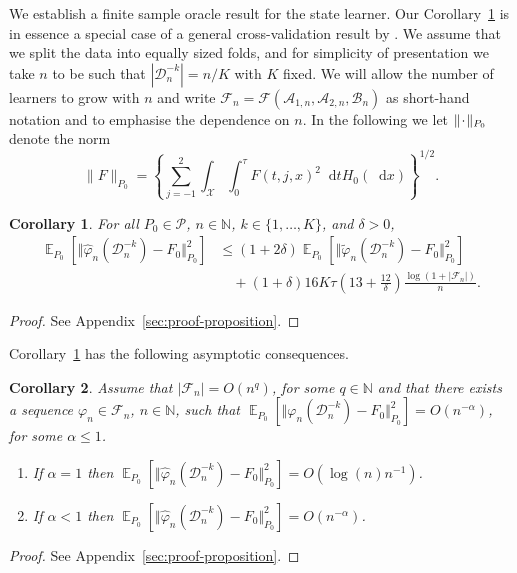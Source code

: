 \documentclass{statsoc}
\newtheorem{corollary}{Corollary}
\DeclareMathOperator{\E}{\mathbb{E}} %
\newcommand{\N}{\mathbb{N}}
\newcommand{\blank}{\makebox[1ex]{\textbf{$\cdot$}}}
\renewcommand{\phi}{\varphi}
\newcommand*\diff{\mathop{}\!\mathrm{d}}
\newcommand\bigO{\textit{O}}
\newcommand{\1}{\mathds{1}}
\newcommand{\data}{\ensuremath{\mathcal{D}}}
\begin{document}
We establish a finite sample oracle result for the state learner.
Our Corollary~\ref{cor:oracle-prop} is in essence a special case of a
general cross-validation result by \cite{vaart2006oracle}. We assume
that we split the data into equally sized folds, and for simplicity of
presentation we take \( n \) to be such that
\( |\data_n^{-k}| = n/K \) with \( K \) fixed. We will allow the
number of learners to grow with \( n \) and write
\( \mathcal{F}_n=\mathcal{F}(\mathcal{A}_{1,n}, \mathcal{A}_{2,n},
\mathcal{B}_n)\) as short-hand notation and to emphasise the
dependence on \( n \).
In the following we let \( \| \blank \|_{P_0} \) denote the norm
\begin{equation}
  \label{eq:norm}
  \| F \|_{P_0} = 
  \left\{
    \sum_{j=-1}^{2}\int_{\mathcal{X}} \int_0^{\tau} F(t, j, x)^2 \diff t H_0( \diff x)
  \right\}^{1/2}.
\end{equation}
\begin{corollary}
  \label{cor:oracle-prop}
  For all \(P_0\in\mathcal{P}\), \( n \in \N \), \( k \in \{1, \dots, K\} \),
  and $\delta>0$,
  \begin{align*}
    \E_{P_0}{\left[ \Vert \hat{\phi}_n(\data_n^{-k}) - F_0 \Vert_{P_0}^2 \right]}
    & \leq (1 + 2\delta)
      \E_{P_0}{\left[ \Vert \tilde{\phi}_n(\data_n^{-k}) - F_0 \Vert_{P_0}^2 \right]}
    \\
    & \quad
      + (1+ \delta) 16   K \tau
      \left(
      13 + \frac{12}{\delta}
      \right)
      \frac{\log(1 + |\mathcal{F}_n|)}{n}.
  \end{align*}
\end{corollary}
\begin{proof}
  See Appendix~\ref{sec:proof-proposition}.
\end{proof}

Corollary~\ref{cor:oracle-prop} has the following asymptotic consequences.

\begin{corollary}
  \label{cor:asymp-cons}
  Assume that \( |\mathcal{F}_n| = \bigO(n^q)\), for some \( q \in \N \)
  and that there exists a sequence \( \phi_n \in \mathcal{F}_n \),
  \( n \in \N \), such that
  \( \E_{P_0}{\left[ \Vert \phi_n(\data_n^{-k}) - F_{0} \Vert_{P_0}^2 \right]} =
  \bigO(n^{-\alpha}) \), for some \( \alpha\leq 1 \).
  \begin{enumerate}[label=(\roman*), topsep=0pt]
  \item If $\alpha=1$ then
    \( \E_{P_0}{\left[ \Vert \hat{\phi}_n(\data_n^{-k}) - F_0 \Vert_{P_0}^2
      \right]} = \bigO(\log(n)n^{-1}) \).
  \item If $\alpha<1$ then
    \( \E_{P_0}{\left[ \Vert \hat{\phi}_n(\data_n^{-k}) - F_0 \Vert_{P_0}^2 \right]} =
    \bigO(n^{-\alpha}) \).
  \end{enumerate}
\end{corollary}
\begin{proof}
  See Appendix~\ref{sec:proof-proposition}.
\end{proof}
\end{document}
